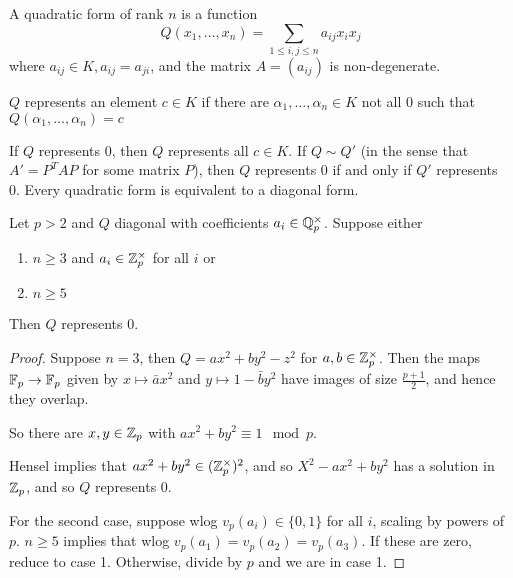 \documentclass[10pt,a4paper]{article}
\begin{document}
A quadratic form of rank $n$ is a function
\[Q(x_1, \ldots, x_n) = \sum_{1 \leq i,j \leq n} a_{ij} x_ix_j\]
where $a_{ij} \in K, a_{ij} = a_{ji}$, and the matrix $A = (a_{ij})$ is non-degenerate.
\begin{definition}
  $Q$ represents an element $c \in K$ if there are $\alpha_1, \ldots, \alpha_n \in K$ not all $0$ such that $Q(\alpha_1, \ldots, \alpha_n) = c$
\end{definition}
If $Q$ represents $0$, then $Q$ represents all $c \in K$. If $Q \sim Q'$ (in the sense that $A' = P^T A P$ for some matrix $P$), then $Q$ represents 0 if and only if $Q'$ represents 0. Every quadratic form is equivalent to a diagonal form.
\begin{proposition}
  Let $p>2$ and $Q$ diagonal with coefficients $a_i \in \mathbb{Q}_p^\times$. Suppose either
  \begin{enumerate}
    \item $n \geq 3$ and $a_i \in \mathbb{Z}_p^\times$ for all $i$ or
    \item $n \geq 5$
  \end{enumerate}
  Then $Q$ represents $0$.
\end{proposition}
\begin{proof}
  Suppose $n=3$, then $Q = ax^2+by^2-z^2$ for $a, b \in \mathbb{Z}_p^\times$. Then the maps $\mathbb{F}_p \to \mathbb{F}_p$ given by $x \mapsto \bar{a}x^2$ and $y\mapsto 1- \bar{b}y^2$ have images of size $\frac{p+1}{2}$, and hence they overlap.

  So there are $x, y \in \mathbb{Z}_p$ with $ax^2+by^2\equiv 1 \mod p$.

  Hensel implies that $ax^2+by^2 \in (\mathbb{Z}_p^\times)^2$, and so $X^2-ax^2+by^2$ has a solution in $\mathbb{Z}_p$, and so $Q$ represents $0$.

  For the second case, suppose wlog $v_p(a_i) \in \{0,1\}$ for all $i$, scaling by powers of $p$. $n \geq 5$ implies that wlog $v_p(a_1) = v_p(a_2) = v_p(a_3)$. If these are zero, reduce to case 1. Otherwise, divide by $p$ and we are in case 1.
\end{proof}
\end{document}
